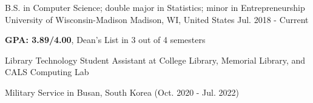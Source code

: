 

\begin{cventries}

  \cventry
  {B.S. in Computer Science; double major in Statistics; minor in Entrepreneurship} %
  {University of Wisconsin-Madison} %
  {Madison, WI, United States} %
  {Jul. 2018 - Current} %
  {
    \begin{cvitems} %
      \item {\textbf{GPA: 3.89/4.00}, Dean's List in 3 out of 4 semesters}
      \item {Library Technology Student Assistant at College Library, Memorial Library, and CALS Computing Lab}
      \item {Military Service in Busan, South Korea (Oct. 2020 - Jul. 2022)}
    \end{cvitems}
  }

\end{cventries}
